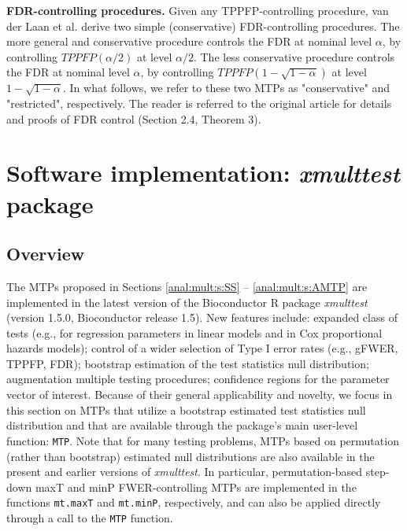\documentclass[11pt]{article}
\newcommand{\Rpackage}[1]{\textit{#1}}
\newcommand{\Robject}[1]{\texttt{#1}}
\begin{document}
\noindent
{\bf FDR-controlling procedures.}
Given any TPPFP-controlling procedure, van der Laan et al. \cite{vdLaanetalMT3SAGMB04} derive two simple (conservative) FDR-controlling procedures. 
The more general and conservative procedure controls the FDR at nominal level $\alpha$, by controlling $TPPFP(\alpha/2)$ at level $\alpha/2$. 
The less conservative procedure controls the FDR at nominal level $\alpha$, by controlling $TPPFP(1 - \sqrt{1-\alpha})$ at level $1 - \sqrt{1-\alpha}$.
In what follows, we refer to these two MTPs as "conservative" and "restricted", respectively.
The reader is referred to the original article for details and proofs of FDR control (Section 2.4, Theorem 3).
 
\section{Software implementation: \Rpackage{xmulttest} package}
\label{anal:mult:s:software}

\subsection{Overview}

The MTPs proposed in Sections \ref{anal:mult:s:SS} -- \ref{anal:mult:s:AMTP} are implemented in the latest version of the Bioconductor R package \Rpackage{xmulttest} (version 1.5.0, Bioconductor release 1.5). 
New features include: 
expanded class of tests (e.g., for regression parameters in linear models and in Cox proportional hazards models);
control of a wider selection of Type I error rates (e.g., gFWER, TPPFP, FDR); 
bootstrap estimation of the test statistics null distribution; 
augmentation multiple testing procedures;  
confidence regions for the parameter vector of interest.
Because of their general applicability and novelty, we focus in this section on MTPs that utilize a bootstrap estimated test statistics null distribution and that are available through the package's main user-level function: \Robject{MTP}.
Note that for many testing problems, MTPs based on permutation (rather than bootstrap) estimated null distributions are also available in the present and earlier versions of \Rpackage{xmulttest}.
In particular, permutation-based step-down maxT and minP FWER-controlling MTPs are implemented in the functions \Robject{mt.maxT} and \Robject{mt.minP}, respectively, and can also be applied directly through a call to the \Robject{MTP} function.
\end{document}
